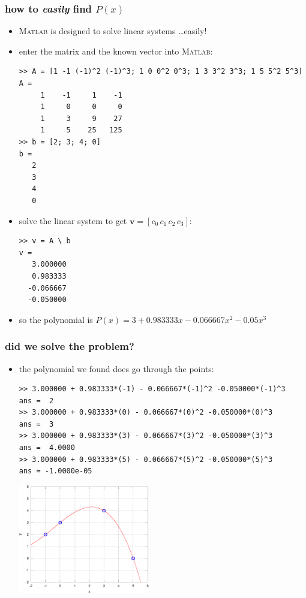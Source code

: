 \documentclass[10pt,hyperref]{beamer}
\newcommand{\bv}{\mathbf{v}}
\newcommand{\Matlab}{\textsc{Matlab}\xspace}
\newcommand{\MO}{\Matlab}
\begin{document}
\begin{frame}[fragile]
\frametitle{how to \emph{easily} find $P(x)$}
  
\begin{itemize}
\item \MO is designed to solve linear systems \dots easily!
\item enter the matrix and the known vector into \MO:

\begin{Verbatim}[frame=single,fontfamily=courier,fontsize=\scriptsize]
>> A = [1 -1 (-1)^2 (-1)^3; 1 0 0^2 0^3; 1 3 3^2 3^3; 1 5 5^2 5^3]
A =
     1    -1     1    -1
     1     0     0     0
     1     3     9    27
     1     5    25   125
>> b = [2; 3; 4; 0]
b =
   2
   3
   4
   0
\end{Verbatim}
\item solve the linear system to get $\bv=[c_0\, c_1\, c_2\, c_3]$:
\begin{Verbatim}[frame=single,fontfamily=courier,fontsize=\scriptsize]
>> v = A \ b
v =
   3.000000
   0.983333
  -0.066667
  -0.050000
\end{Verbatim}
\item so the polynomial is $P(x) = 3 + 0.983333 x - 0.066667 x^2 - 0.05 x^3$
\end{itemize}
\end{frame}


\begin{frame}[fragile]
\frametitle{did we solve the problem?}

\begin{itemize}
\item the polynomial we found does go through the points:

\medskip
\begin{Verbatim}[frame=single,fontfamily=courier,fontsize=\scriptsize]
>> 3.000000 + 0.983333*(-1) - 0.066667*(-1)^2 -0.050000*(-1)^3
ans =  2
>> 3.000000 + 0.983333*(0) - 0.066667*(0)^2 -0.050000*(0)^3
ans =  3
>> 3.000000 + 0.983333*(3) - 0.066667*(3)^2 -0.050000*(3)^3
ans =  4.0000
>> 3.000000 + 0.983333*(5) - 0.066667*(5)^2 -0.050000*(5)^3
ans = -1.0000e-05
\end{Verbatim}

\medskip
  \begin{center}
  \includegraphics[width=0.45\textwidth]{ex1solved}
  \end{center}
\end{itemize}
\end{frame}
\end{document}
